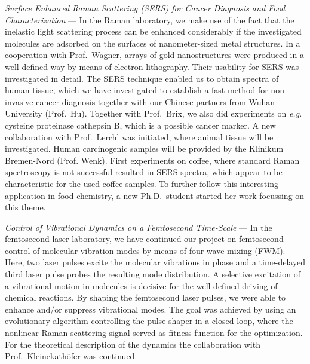 \textit{Surface Enhanced Raman Scattering (SERS) for Cancer
Diagnosis and Food Characterization} --- In the Raman laboratory,
we make use of the fact that the inelastic light scattering
process can be enhanced considerably if the investigated molecules
are adsorbed on the surfaces of nanometer-sized metal structures.
In a cooperation with Prof.\ Wagner, arrays of gold nanostructures
were produced in a well-defined way by means of electron
lithography. Their usability for SERS was investigated in detail.
The SERS technique enabled us to obtain spectra of human tissue,
which we have investigated to establish a fast method for
non-invasive cancer diagnosis together with our Chinese partners
from Wuhan University (Prof.\ Hu). Together with Prof.\ Brix, we
also did experiments on \textit{e.g.} cysteine proteinase
cathepsin B, which is a possible cancer marker. A new
collaboration with Prof.\ Lerchl was initiated, where animal
tissue will be investigated. Human carcinogenic samples will be
provided by the Klinikum Bremen-Nord (Prof. Wenk). First
experiments on coffee, where standard Raman spectroscopy is not
successful resulted in SERS spectra, which appear to be
characteristic for the used coffee samples. To further follow this
interesting application in food chemistry, a new Ph.D.\ student
started her work focussing on this theme.

\textit{Control of Vibrational Dynamics on a Femtosecond
Time-Scale} --- In the femtosecond laser laboratory, we have
continued our project on femtosecond control of molecular
vibration modes by means of four-wave mixing (FWM). Here, two
laser pulses excite the molecular vibrations in phase and a
time-delayed third laser pulse probes the resulting mode
distribution. A selective excitation of a vibrational motion in
molecules is decisive for the well-defined driving of chemical
reactions. By shaping the femtosecond laser pulses, we were able
to enhance and/or suppress vibrational modes. The goal was
achieved by using an evolutionary algorithm controlling the pulse
shaper in a closed loop, where the nonlinear Raman scattering
signal served as fitness function for the optimization. For the
theoretical description of the dynamics the collaboration with
Prof.\ Kleinekath\"{o}fer was continued.

